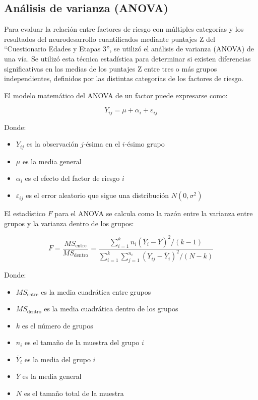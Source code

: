 \documentclass[11pt,letterpaper]{report}
\newcommand{\asq}{“Cuestionario Edades y Etapas 3”}
\begin{document}
\subsection{Análisis de varianza (ANOVA)}
Para evaluar la relación entre factores de riesgo con múltiples categorías y
los resultados del neurodesarrollo cuantificados mediante puntajes Z del 
\asq, se utilizó el análisis de varianza (ANOVA) de una vía. Se utilizó esta
técnica estadística para determinar si existen diferencias significativas en las
medias de los puntajes Z entre tres o más grupos independientes, definidos por
las distintas categorías de los factores de riesgo.

El modelo matemático del ANOVA de un factor puede expresarse como:

\begin{equation}
Y_{ij} = \mu + \alpha_i + \varepsilon_{ij}
\end{equation}

Donde:
\begin{itemize}
    \item $Y_{ij}$ es la observación $j$-ésima en el $i$-ésimo grupo
    \item $\mu$ es la media general
    \item $\alpha_i$ es el efecto del factor de riesgo $i$
    \item $\varepsilon_{ij}$ es el error aleatorio que sigue una distribución $N(0, \sigma^2)$
\end{itemize}

El estadístico $F$ para el ANOVA se calcula como la razón entre la varianza
entre grupos y la varianza dentro de los grupos:

\begin{equation}
F = \frac{MS_{\text{entre}}}{MS_{\text{dentro}}} = \frac{\sum_{i=1}^{k} n_i(\bar{Y}_i - \bar{Y})^2/(k-1)}{\sum_{i=1}^{k}\sum_{j=1}^{n_i} (Y_{ij} - \bar{Y}_i)^2/(N-k)}
\end{equation}

Donde:
\begin{itemize}
    \item $MS_{\text{entre}}$ es la media cuadrática entre grupos
    \item $MS_{\text{dentro}}$ es la media cuadrática dentro de los grupos
    \item $k$ es el número de grupos
    \item $n_i$ es el tamaño de la muestra del grupo $i$
    \item $\bar{Y}_i$ es la media del grupo $i$
    \item $\bar{Y}$ es la media general
    \item $N$ es el tamaño total de la muestra
\end{itemize}
\end{document}
